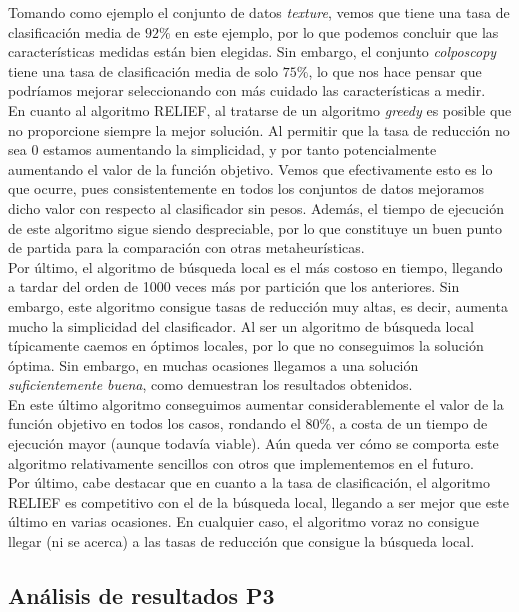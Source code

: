 \documentclass[12pt]{article}
\begin{document}
Tomando como ejemplo el conjunto de datos \textit{texture}, vemos que tiene una tasa de clasificación media de $92\%$ en este ejemplo, por lo que podemos concluir que las características medidas están bien elegidas. Sin embargo, el conjunto \textit{colposcopy} tiene una tasa de clasificación media de solo $75\%$, lo que nos hace pensar que podríamos mejorar seleccionando con más cuidado las características a medir.\\

En cuanto al algoritmo RELIEF, al tratarse de un algoritmo \textit{greedy} es posible que no proporcione siempre la mejor solución. Al permitir que la tasa de reducción no sea $0$ estamos aumentando la simplicidad, y por tanto potencialmente aumentando el valor de la función objetivo. Vemos que efectivamente esto es lo que ocurre, pues consistentemente en todos los conjuntos de datos mejoramos dicho valor con respecto al clasificador sin pesos. Además, el tiempo de ejecución de este algoritmo sigue siendo despreciable, por lo que constituye un buen punto de partida para la comparación con otras metaheurísticas.\\

Por último, el algoritmo de búsqueda local es el más costoso en tiempo, llegando a tardar del orden de 1000 veces más por partición que los anteriores. Sin embargo, este algoritmo consigue tasas de reducción muy altas, es decir, aumenta mucho la simplicidad del clasificador. Al ser un algoritmo de búsqueda local típicamente caemos en óptimos locales, por lo que no conseguimos la solución óptima. Sin embargo, en muchas ocasiones llegamos a una solución \textit{suficientemente buena}, como demuestran los resultados obtenidos.\\

En este último algoritmo conseguimos aumentar considerablemente el valor de la función objetivo en todos los casos, rondando el 80$\%$, a costa de un tiempo de ejecución mayor (aunque todavía viable). Aún queda ver cómo se comporta este algoritmo relativamente sencillos con otros que implementemos en el futuro.\\

Por último, cabe destacar que en cuanto a la tasa de clasificación, el algoritmo RELIEF es competitivo con el de la búsqueda local, llegando a ser mejor que este último en varias ocasiones. En cualquier caso, el algoritmo voraz no consigue llegar (ni se acerca) a las tasas de reducción que consigue la búsqueda local.

\subsection*{Análisis de resultados P3}
\label{analisis}
\end{document}
